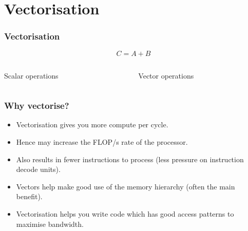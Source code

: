 \documentclass{beamer}
\begin{document}
\section{Vectorisation}
\begin{frame}
\frametitle{Vectorisation}
$$C=A+B$$
\begin{columns}
\begin{column}{0.5\textwidth}
Scalar operations \\
\end{column}

\begin{column}{0.5\textwidth}
Vector operations \\
\end{column}
\end{columns}

\end{frame}

\begin{frame}
\frametitle{Why vectorise?}
\begin{itemize}
  \item Vectorisation gives you more compute per cycle.
  \item Hence may increase the FLOP/s rate of the processor.
  \item Also results in fewer instructions to process (less pressure on instruction decode units).
  \item Vectors help make good use of the memory hierarchy (often the main benefit).
  \item Vectorisation helps you write code which has good access patterns to maximise bandwidth.
\end{itemize}
\end{frame}
\end{document}
